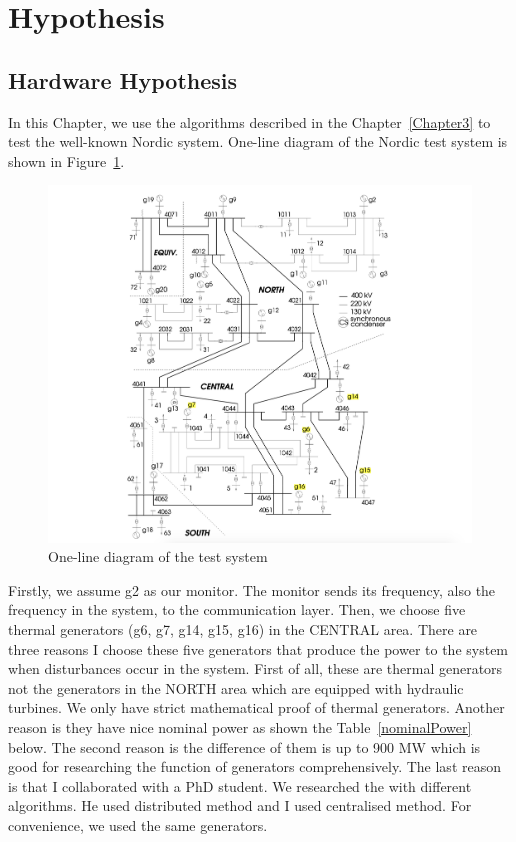 \section{Hypothesis} %
\label{section4.1}
\subsection{Hardware Hypothesis} %
\label{subsection4.1.1}

In this Chapter, we use the algorithms described in the Chapter~\ref{Chapter3} to test the well-known Nordic system. One-line diagram of the Nordic test system is  shown in Figure~\ref{4_1_1_nordic}. 

\begin{figure}[htbp]
\centering
\includegraphics[width = .891\textwidth]{figure/4_1_1_nordic.png}
\caption{One-line diagram of the test system}
\label{4_1_1_nordic}
\end{figure}

Firstly, we assume g2 as our monitor. The monitor sends its frequency, also the frequency in the system, to the communication layer. Then, we choose five thermal generators  (g6, g7, g14, g15, g16) in the CENTRAL area. There are three reasons I choose these five generators that produce the power to the system when disturbances occur in the system. First of all, these are thermal generators not the generators in the NORTH area which are equipped with hydraulic turbines. We only have strict mathematical proof of thermal generators. Another reason is they have nice nominal power as shown the Table~\ref{nominalPower} below. The second reason is the difference of them is up to 900 MW which is good for researching the function of generators comprehensively. The last reason is that I collaborated with a PhD student. We researched the  with different algorithms. He used distributed method and I used centralised method. For convenience, we used the same generators.


